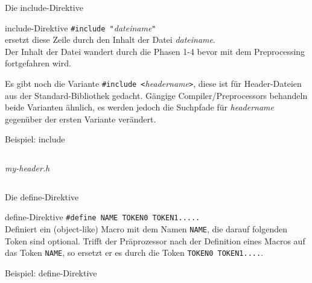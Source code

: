 \begin{frame}[fragile]{Die include-Direktive}
	\begin{block}{include-Direktive}
		\verb|#include "|\emph{dateiname}\verb|"| \\
		\vspace{0.5em}
		ersetzt diese Zeile durch den Inhalt der Datei \emph{dateiname}. \\
		Der Inhalt der Datei wandert durch die Phasen 1-4 bevor mit dem Preprocessing fortgefahren wird.
	\end{block}
	
	\pause
	\vspace{1em}
	
	Es gibt noch die Variante \verb|#include <|\emph{headername}\verb|>|, diese ist für Header-Dateien aus der Standard-Bibliothek gedacht. Gängige Compiler/Preprocessors behandeln beide Varianten ähnlich, es werden jedoch die Suchpfade für \emph{headername} gegenüber der ersten Variante verändert.
\end{frame}

\begin{frame}{Beispiel: include}
	\footnotesize
	
	\begin{columns}
		\emph{my-header.h}
		
		
		
	\end{columns}
\end{frame}

\begin{frame}[fragile]{Die define-Direktive}
	\begin{block}{define-Direktive}
		\verb|#define NAME TOKEN0 TOKEN1.....| \\
		\vspace{0.5em}
		Definiert ein (object-like) Macro mit dem Namen \verb|NAME|, die darauf folgenden Token sind optional. Trifft der Präprozessor nach der Definition eines Macros auf das Token \verb|NAME|, so ersetzt er es durch die Token \verb|TOKEN0 TOKEN1....|.
	\end{block}
\end{frame}

\begin{frame}{Beispiel: define-Direktive}
	\footnotesize
	
\end{frame}

